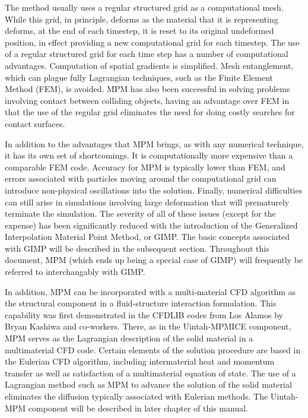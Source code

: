 The method usually uses a regular structured grid as a computational mesh.
While this grid, in principle, deforms as the material that it is representing
deforms, at the end of each timestep, it is reset to its original undeformed
position, in effect providing a new computational grid for each timestep.
The use of a regular structured grid for each time step has a number of
computational advantages.  Computation of spatial gradients is simplified.
Mesh entanglement, which can plague fully Lagrangian techniques, such as
the Finite Element Method (FEM), is avoided.  MPM has also been successful
in solving problems involving contact between colliding objects, having an
advantage over FEM in that the use of the regular grid eliminates the
need for doing costly searches for contact surfaces\cite{bard}.

In addition to the advantages that MPM brings, as with any numerical technique, it has its own set of shortcomings.  It is computationally more
expensive than a comparable FEM code.  Accuracy for MPM is typically lower
than FEM, and errors associated with particles moving around the computational
grid can introduce non-physical oscillations into the solution.  Finally,
numerical difficulties can still arise in simulations involving large
deformation that will prematurely terminate the simulation.  The severity of
all of these issues (except for the expense) has been significantly reduced
with the introduction of the Generalized Interpolation Material Point Method,
or GIMP\cite{bardgimp}.  The basic concepts associated with GIMP will be
described in the subsequent section.  Throughout this document, MPM (which
ends up being a special case of GIMP) will frequently be referred to
interchangably with GIMP.

In addition, MPM can be incorporated with a multi-material CFD algorithm
as the structural component in a fluid-structure interaction formulation.
This capability was first demonstrated in the CFDLIB codes from
Los Alamos by Bryan Kashiwa and co-workers\cite{kashiwa2000}.  There, as
in the Uintah-MPMICE component,
MPM serves as the Lagrangian description of the solid
material in a multimaterial CFD code.  Certain elements of the
solution procedure are based in the Eulerian CFD algorithm, including
intermaterial heat and momentum transfer as well as satisfaction
of a multimaterial equation of state.  The use of a Lagrangian method
such as MPM to advance the solution of the solid material eliminates
the diffusion typically associated with Eulerian methods.  The Uintah-MPM
component will be described in later chapter of this manual.

